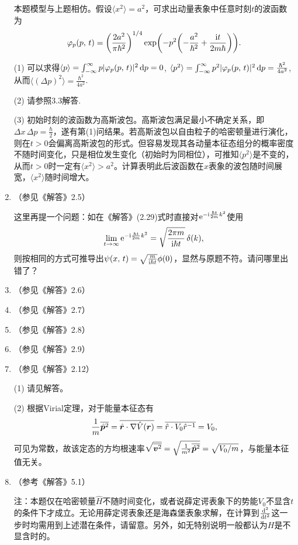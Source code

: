 \begin{enumerate}[label=\textbf{3.\arabic*}, leftmargin=-0.5mm]
本题模型与上题相仿。假设$\langle x^2 \rangle = a^2$，可求出动量表象中任意时刻$t$的波函数为
\[\varphi_p(p,\,t) = \qty(\frac{2a^2}{\pi\hbar^2})^{1/4} \exp(-p^2\qty(-\frac{a^2}{\hbar^2}+\frac{\mathrm{i} t}{2m\hbar})).\]

(1) 可以求得$\langle p\rangle = \int_{-\infty}^\infty p|\varphi_p(p,\,t)|^2\dd{p} = 0$, $\langle p^2\rangle = \int_{-\infty}^\infty p^2|\varphi_p(p,\,t)|^2\dd{p} = \frac{\hbar^2}{4a^2}$, 从而$\langle(\Delta p)^2\rangle = \frac{\hbar^2}{4a^2}$.

(2) 请参照3.3解答.

(3) 初始时刻的波函数为高斯波包。高斯波包满足最小不确定关系，即$\Delta x \,\Delta p= \frac{\hbar}{2}$，遂有第(1)问结果。若高斯波包以自由粒子的哈密顿量进行演化，则在$t>0$会偏离高斯波包的形式。但容易发现其各动量本征态组分的概率密度不随时间变化，只是相位发生变化（初始时为同相位），可推知$\langle p^2\rangle$是不变的，从而$t>0$时一定有$\langle x^2\rangle>a^2$。计算表明此后波函数在$x$表象的波包随时间展宽，$\langle x^2\rangle$随时间增大。

\item（参见《解答》2.5）

这里再提一个问题：如在《解答》(2.29)式时直接对$\mathrm{e}^{-\mathrm{i}\frac{\hbar t}{2m}k^2}$使用
\[\lim_{t\rightarrow \infty} \mathrm{e}^{-\mathrm{i}\frac{\hbar t}{2m}k^2} = \sqrt{\frac{2\pi m}{\mathrm{i} \hbar t}} \,\delta(k),\]
则按相同的方式可推导出$\psi(x,\,t)=\sqrt{\frac{m}{\mathrm{i}\hbar t}}\phi(0)$，显然与原题不符。请问哪里出错了？

\item（参见《解答》2.6）

\item（参见《解答》2.7）

\item（参见《解答》2.8）

\item（参见《解答》2.9）

\item（参见《解答》2.12）

(1) 请见解答。

(2) 根据Virial定理，对于能量本征态有
\[\frac{1}{m}\overline{\hat{\boldsymbol{p}}^2}=\overline{\hat{\boldsymbol{r}}\cdot \nabla \hat{V}(\boldsymbol{r})}
=\overline{\hat{r}\cdot V_0\hat{r}^{-1}} = V_0,\]
可见为常数，故该定态的方均根速率$\sqrt{\overline{\boldsymbol{v}^2}}=\sqrt{\frac{1}{m^2}\overline{\hat{\boldsymbol{p}}^2}}=\sqrt{V_0/m}$，与能量本征值无关。

\item（参考《解答》5.1）

注：本题仅在哈密顿量$\hat{H}$不随时间变化，或者说薛定谔表象下的势能$V_0$不显含$t$的条件下才成立。无论用薛定谔表象还是海森堡表象求解，在计算到$\dv[2]{t}$这一步时均需用到上述潜在条件，请留意。另外，如无特别说明一般都认为$H$是不显含时的。


\end{enumerate}
